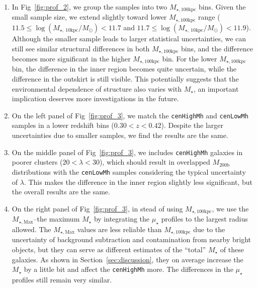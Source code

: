 \documentclass[a4paper,fleqn,usenatbib]{mnras}
\def\rbcg{\texttt{cenHighMh}}
\def\nbcg{\texttt{cenLowMh}}
\def\mstar{{$M_{\star}$}}
\def\mhalo{{$M_{\mathrm{200b}}$}}
\def\mtot{{$M_{\star,100\mathrm{kpc}}$}}
\def\mmax{{$M_{\star,\mathrm{Max}}$}}
\def\mden{{$\mu_{\star}$}}
\begin{document}
    \begin{enumerate}
        
        \item In Fig~\ref{fig:prof_2}, we group the samples into two \mtot{} bins. 
            Given the small sample size, we extend slightly toward lower \mtot{} range 
            ($11.5 \leq \log (M_{\star,\ 10\mathrm{kpc}}/M_{\odot}) < 11.7$ and 
             $11.7 \leq \log (M_{\star,\ 10\mathrm{kpc}}/M_{\odot}) < 11.9$). 
            Although the smaller sample leads to larger statistical uncertainties, 
            we can still see similar structural differences in both \mtot{} bins, 
            and the difference becomes more significant in the higher \mtot{} bin.  
            For the lower \mtot{} bin, the difference in the inner region becomes 
            quite uncertain, while the difference in the outskirt is still visible. 
            This potentially suggests that the environmental dependence of structure 
            also varies with \mstar{}, an important implication deserves more 
            investigations in the future.   

        \item On the left panel of Fig~\ref{fig:prof_3}, we match the \rbcg{} and 
            \nbcg{} samples in a lower redshift bins ($0.30 < z < 0.42$).
            Despite the larger uncertainties due to smaller samples, we find the 
            results are the same.
            
        \item On the middle panel of Fig~\ref{fig:prof_3}, we includes \rbcg{} 
            galaxies in poorer clusters ($20 < \lambda < 30$), which should result 
            in overlapped \mhalo{} distributions with the \nbcg{} samples 
            considering the typical uncertainty of $\lambda$.
            This makes the difference in the inner region slightly less significant, 
            but the overall results are the same. 
             
        \item On the right panel of Fig~\ref{fig:prof_3}, in stead of using \mtot{}, 
            we use the \mmax{}--the maximum \mstar{} by integrating the \mden{} 
            profiles to the largest radius allowed.  
            The \mmax{} values are less reliable than \mtot{} due to the 
            uncertainty of background subtraction and contamination from nearby 
            bright objects, but they can serve as different estimates of the ``total''
            \mstar{} of these galaxies.
            As shown in Section~\ref{sec:discussion}, they on average increase
            the \mstar{} by a little bit and affect the \rbcg{} more.
            The differences in the \mden{} profiles still remain very similar.
      
    \end{enumerate}
    
\end{document}
